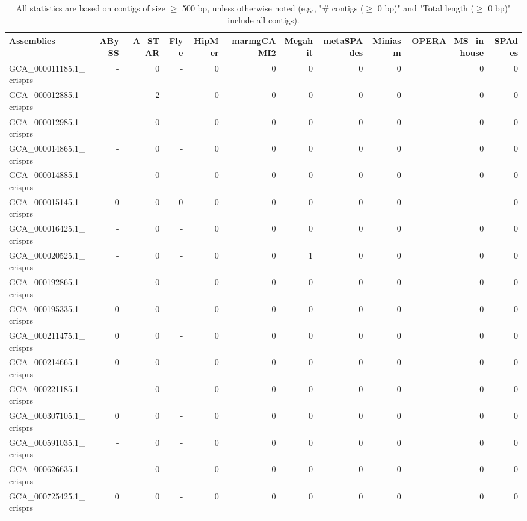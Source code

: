 \documentclass[12pt,a4paper]{article}
\begin{document}
\begin{table}[ht]
\begin{center}
\caption{All statistics are based on contigs of size $\geq$ 500 bp, unless otherwise noted (e.g., "\# contigs ($\geq$ 0 bp)" and "Total length ($\geq$ 0 bp)" include all contigs).}
\begin{tabular}{|l*{10}{|r}|}
\hline
Assemblies & ABySS & A\_STAR & Flye & HipMer & marmgCAMI2 & Megahit & metaSPAdes & Miniasm & OPERA\_MS\_inhouse & SPAdes \\ \hline
GCA\_000011185.1\_crisprs & - & 0 & - & 0 & 0 & 0 & 0 & 0 & 0 & 0 \\ \hline
GCA\_000012885.1\_crisprs & - & 2 & - & 0 & 0 & 0 & 0 & 0 & 0 & 0 \\ \hline
GCA\_000012985.1\_crisprs & - & 0 & - & 0 & 0 & 0 & 0 & 0 & 0 & 0 \\ \hline
GCA\_000014865.1\_crisprs & - & 0 & - & 0 & 0 & 0 & 0 & 0 & 0 & 0 \\ \hline
GCA\_000014885.1\_crisprs & - & 0 & - & 0 & 0 & 0 & 0 & 0 & 0 & 0 \\ \hline
GCA\_000015145.1\_crisprs & 0 & 0 & 0 & 0 & 0 & 0 & 0 & 0 & - & 0 \\ \hline
GCA\_000016425.1\_crisprs & - & 0 & - & 0 & 0 & 0 & 0 & 0 & 0 & 0 \\ \hline
GCA\_000020525.1\_crisprs & - & 0 & - & 0 & 0 & 1 & 0 & 0 & 0 & 0 \\ \hline
GCA\_000192865.1\_crisprs & - & 0 & - & 0 & 0 & 0 & 0 & 0 & 0 & 0 \\ \hline
GCA\_000195335.1\_crisprs & 0 & 0 & - & 0 & 0 & 0 & 0 & 0 & 0 & 0 \\ \hline
GCA\_000211475.1\_crisprs & 0 & 0 & - & 0 & 0 & 0 & 0 & 0 & 0 & 0 \\ \hline
GCA\_000214665.1\_crisprs & 0 & 0 & - & 0 & 0 & 0 & 0 & 0 & 0 & 0 \\ \hline
GCA\_000221185.1\_crisprs & - & 0 & - & 0 & 0 & 0 & 0 & 0 & 0 & 0 \\ \hline
GCA\_000307105.1\_crisprs & 0 & 0 & - & 0 & 0 & 0 & 0 & 0 & 0 & 0 \\ \hline
GCA\_000591035.1\_crisprs & - & 0 & - & 0 & 0 & 0 & 0 & 0 & 0 & 0 \\ \hline
GCA\_000626635.1\_crisprs & - & 0 & - & 0 & 0 & 0 & 0 & 0 & 0 & 0 \\ \hline
GCA\_000725425.1\_crisprs & 0 & 0 & - & 0 & 0 & 0 & 0 & 0 & 0 & 0 \\ \hline
\end{tabular}
\end{center}
\end{table}
\end{document}
